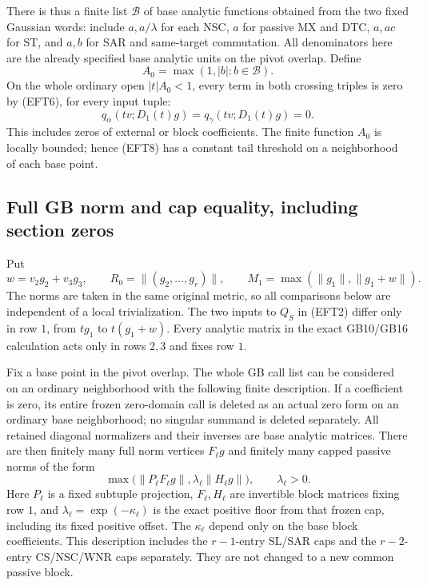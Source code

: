 There is thus a finite list $\mathcal B$ of base analytic
functions obtained from the two fixed Gaussian words: include
$a,a/\lambda$ for each NSC, $a$ for passive MX and DTC,
$a,ac$ for ST, and $a,b$ for SAR and same-target commutation.
All denominators here are the already specified base analytic
units on the pivot overlap.  Define
\[
                       A_0=\max(1,|b|:b\in\mathcal B).
 \tag{EFT7}
\]
On the whole ordinary open $|t|A_0<1$, every term in both
crossing triples is zero by (EFT6), for every input tuple:
\[
             q_\alpha(tv;D_1(t)g)
                   =q_\gamma(tv;D_1(t)g)=0.
 \tag{EFT8}
\]
This includes zeros of external or block coefficients.  The
finite function $A_0$ is locally bounded; hence (EFT8) has a
constant tail threshold on a neighborhood of each base point.

\subsection{Full GB norm and cap equality, including section zeros}

Put
\[
             w=v_2g_2+v_3g_3,\qquad
             R_0=\|(g_2,\ldots,g_r)\|,\qquad
             M_1=\max(\|g_1\|,\|g_1+w\|).
 \tag{EFT9}
\]
The norms are taken in the same original metric, so all comparisons
below are independent of a local trivialization.  The two inputs
to $Q_S$ in (EFT2) differ only in row $1$, from $tg_1$ to
$t(g_1+w)$.  Every analytic matrix in the exact GB10/GB16
calculation acts only in rows $2,3$ and fixes row $1$.

Fix a base point in the pivot overlap.  The whole GB call list
can be considered on an ordinary neighborhood with the following
finite description.  If a coefficient is zero, its entire frozen
zero-domain call is deleted as an actual zero form on an ordinary
base neighborhood; no singular summand is deleted separately.
All retained diagonal normalizers and their inverses are base
analytic matrices.  There are then finitely many full norm
vertices $F_\ell g$ and finitely many capped passive norms of
the form
\[
 \max\bigl(\|P_\ell F_\ell g\|,
                       \lambda_\ell\|H_\ell g\|\bigr),
                     \qquad \lambda_\ell>0.
 \tag{EFT10}
\]
Here $P_\ell$ is a fixed subtuple projection, $F_\ell,H_\ell$
are invertible block matrices fixing row $1$, and
$\lambda_\ell=\exp(-\kappa_\ell)$ is the exact positive floor
from that frozen cap, including its fixed positive offset.
The $\kappa_\ell$ depend only on the base block coefficients.
This description includes the $r-1$-entry SL/SAR caps and the
$r-2$-entry CS/NSC/WNR caps separately.  They are not changed
to a new common passive block.

